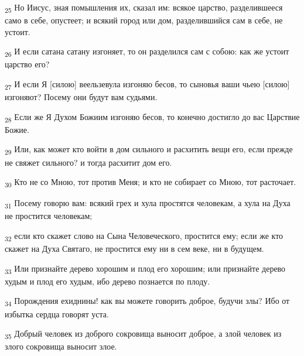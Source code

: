 \begin{tcolorbox}
\textsubscript{25} Но Иисус, зная помышления их, сказал им: всякое царство, разделившееся само в себе, опустеет; и всякий город или дом, разделившийся сам в себе, не устоит.
\end{tcolorbox}
\begin{tcolorbox}
\textsubscript{26} И если сатана сатану изгоняет, то он разделился сам с собою: как же устоит царство его?
\end{tcolorbox}
\begin{tcolorbox}
\textsubscript{27} И если Я [силою] веельзевула изгоняю бесов, то сыновья ваши чьею [силою] изгоняют? Посему они будут вам судьями.
\end{tcolorbox}
\begin{tcolorbox}
\textsubscript{28} Если же Я Духом Божиим изгоняю бесов, то конечно достигло до вас Царствие Божие.
\end{tcolorbox}
\begin{tcolorbox}
\textsubscript{29} Или, как может кто войти в дом сильного и расхитить вещи его, если прежде не свяжет сильного? и тогда расхитит дом его.
\end{tcolorbox}
\begin{tcolorbox}
\textsubscript{30} Кто не со Мною, тот против Меня; и кто не собирает со Мною, тот расточает.
\end{tcolorbox}
\begin{tcolorbox}
\textsubscript{31} Посему говорю вам: всякий грех и хула простятся человекам, а хула на Духа не простится человекам;
\end{tcolorbox}
\begin{tcolorbox}
\textsubscript{32} если кто скажет слово на Сына Человеческого, простится ему; если же кто скажет на Духа Святаго, не простится ему ни в сем веке, ни в будущем.
\end{tcolorbox}
\begin{tcolorbox}
\textsubscript{33} Или признайте дерево хорошим и плод его хорошим; или признайте дерево худым и плод его худым, ибо дерево познается по плоду.
\end{tcolorbox}
\begin{tcolorbox}
\textsubscript{34} Порождения ехиднины! как вы можете говорить доброе, будучи злы? Ибо от избытка сердца говорят уста.
\end{tcolorbox}
\begin{tcolorbox}
\textsubscript{35} Добрый человек из доброго сокровища выносит доброе, а злой человек из злого сокровища выносит злое.
\end{tcolorbox}
